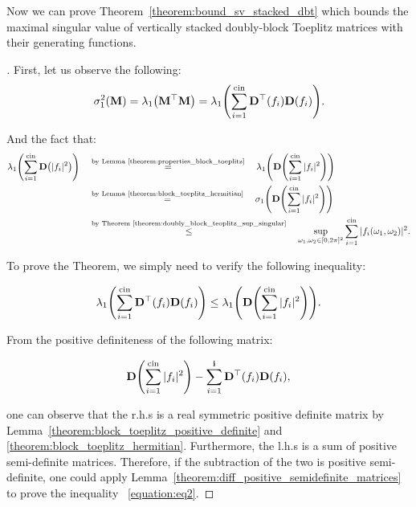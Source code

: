Now we can prove Theorem~\ref{theorem:bound_sv_stacked_dbt} which bounds the maximal singular value of vertically stacked doubly-block Toeplitz matrices with their generating functions. 

\begin{proof}[]
First, let us observe the following:
\begin{equation}
    \sigma_1^2 \left( \Mmat \right) = \lambda_1 \left( \Mmat^{\top} \Mmat \right) = \lambda_1 \left( \sum_{i=1}^{\cin} \Dmat^{\top} \left(f_i \right) \Dmat (f_i) \right).
\end{equation}

And the fact that:
\begin{align}
    \lambda_1 \left( \sum_{i=1}^{\cin} \Dmat \left(|f_i|^2 \right) \right) \quad &\stackrel{\text{by Lemma~\ref{theorem:properties_block_toeplitz}}}{=} \quad \lambda_1 \left( \Dmat \left( \sum_{i=1}^{\cin} |f_i|^2 \right) \right) \\ 
    \quad &\stackrel{\text{by Lemma~\ref{theorem:block_toeplitz_hermitian}}}{=} \quad \sigma_1 \left( \Dmat \left( \sum_{i=1}^{\cin} |f_i|^2 \right) \right) \\
    \quad &\stackrel{\text{by Theorem~\ref{theorem:doubly_block_teoplitz_sup_singular}}}{\leq} \quad \sup_{\omega_1, \omega_2 \in [0, 2\pi]^2} \sum_{i=1}^{\cin} |f_i(\omega_1, \omega_2)|^2.
\end{align}

To prove the Theorem, we simply need to verify the following inequality:

\begin{equation}
    \lambda_1 \left( \sum_{i=1}^{\cin} \Dmat^{\top} \left(f_i \right) \Dmat (f_i) \right) \leq \lambda_1 \left( \Dmat \left( \sum_{i=1}^{\cin} |f_i|^2 \right) \right). \label{equation:eq2}
\end{equation}

From the positive definiteness of the following matrix:

\begin{equation}
    \Dmat \left( \sum_{i=1}^{\cin} |f_i|^2 \right) - \sum_{i=1}^{\ci} \Dmat^{\top} \left(f_i \right) \Dmat (f_i),
\end{equation}

one can observe that the r.h.s is a real symmetric positive definite matrix by Lemma~\ref{theorem:block_toeplitz_positive_definite} and \ref{theorem:block_toeplitz_hermitian}. Furthermore, the l.h.s is a sum of positive semi-definite matrices. Therefore, if the subtraction of the two is positive semi-definite, one could apply Lemma~\ref{theorem:diff_positive_semidefinite_matrices} to prove the inequality
~\ref{equation:eq2}. 



\end{proof}
